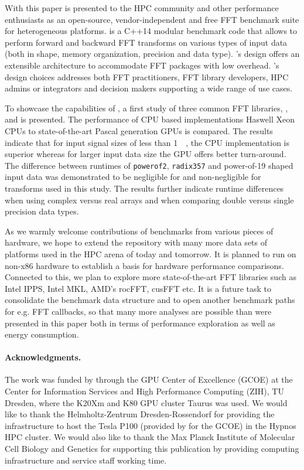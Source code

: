 
With this paper \gearshifft{} is presented to the HPC community and other performance enthusiasts as an open-source, vendor-independent and free FFT benchmark suite for heterogeneous platforms. \gearshifft{} is a C++14 modular benchmark code that allows to perform forward and backward FFT transforms on various types of input data (both in shape, memory organization, precision and data type). \gearshifft{}'s design offers an extensible architecture to accommodate FFT packages with low overhead. \gearshifft{}'s design choices addresses both FFT practitioners, FFT library developers, HPC admins or integrators and decision makers supporting a wide range of use cases. 

To showcase the capabilities of \gearshifft{}, a first study of three common FFT libraries, \fftw{}, \clfft{} and \cufft{} is presented. The performance of CPU based implementations Haswell Xeon CPUs to state-of-the-art Pascal generation \nvidia{} GPUs is compared. The results indicate that for input signal sizes of less than \SI{1}{\mebi\byte}, the CPU implementation is superior whereas for larger input data size the GPU offers better turn-around. The difference between runtimes of \texttt{powerof2}, \texttt{radix357} and power-of-19 shaped input data was demonstrated to be negligible for \fftw{} and non-negligible for \cufft{} transforms used in this study. The results further indicate runtime differences when using complex versus real arrays and when comparing double versus single precision data types.     

As we warmly welcome contributions of benchmarks from various pieces of hardware, we hope to extend the \gearshifft{} repository with many more data sets of platforms used in the HPC arena of today and tomorrow. It is planned to run \gearshifft{} on non-x86 hardware to establish a basis for hardware performance comparisons. Connected to this, we plan to explore more state-of-the-art FFT libraries such as Intel IPPS, Intel MKL, AMD's rocFFT, cusFFT etc. It is a future task to consolidate the benchmark data structure and to open another benchmark paths for e.g. FFT callbacks, so that many more analyses are possible than were presented in this paper both in terms of performance exploration as well as energy consumption.

\paragraph{Acknowledgments.} The work was funded by \nvidia{} through the GPU Center of Excellence (GCOE) at the Center for Information Services and High Performance Computing (ZIH), TU Dresden, where the K20Xm and K80 GPU cluster Taurus was used. We would like to thank the Helmholtz-Zentrum Dresden-Rossendorf for providing the infrastructure to host the \nvidia{} Tesla P100 (provided by \nvidia{} for the GCOE) in the Hypnos HPC cluster. We would also like to thank the Max Planck Institute of Molecular Cell Biology and Genetics for supporting this publication by providing computing infrastructure and service staff working time.
